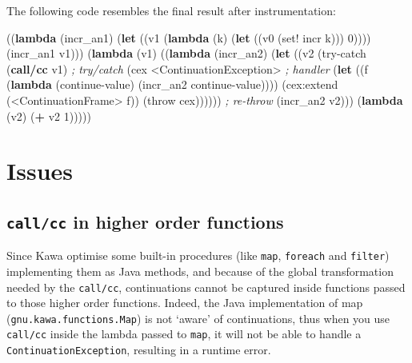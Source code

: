 \documentclass[12pt,a4paper,oneside,openright]{book}
\newenvironment{Shaded}{\begin{snugshade}}{\end{snugshade}}
\newcommand{\KeywordTok}[1]{\textcolor[rgb]{0.13,0.29,0.53}{\textbf{{#1}}}}
\newcommand{\DecValTok}[1]{\textcolor[rgb]{0.00,0.00,0.81}{{#1}}}
\newcommand{\CommentTok}[1]{\textcolor[rgb]{0.56,0.35,0.01}{\textit{{#1}}}}
\newcommand{\NormalTok}[1]{{#1}}
\begin{document}
The following code resembles the final result after instrumentation:

\begin{Shaded}
\begin{Highlighting}[]
    \NormalTok{((}\KeywordTok{lambda} \NormalTok{(incr_an1)}
      \NormalTok{(}\KeywordTok{let} \NormalTok{((v1 (}\KeywordTok{lambda} \NormalTok{(k)}
                  \NormalTok{(}\KeywordTok{let} \NormalTok{((v0 (set! incr k)))}
                    \DecValTok{0}\NormalTok{))))}
         \NormalTok{(incr_an1 v1)))}
     \NormalTok{(}\KeywordTok{lambda} \NormalTok{(v1)}
       \NormalTok{((}\KeywordTok{lambda} \NormalTok{(incr_an2)}
          \NormalTok{(}\KeywordTok{let} \NormalTok{((v2 (try-catch (}\KeywordTok{call/cc} \NormalTok{v1)             }\CommentTok{; try/catch}
                      \NormalTok{(cex <ContinuationException>      }\CommentTok{; handler}
                         \NormalTok{(}\KeywordTok{let} \NormalTok{((f (}\KeywordTok{lambda} \NormalTok{(continue-value)}
                                    \NormalTok{(incr_an2 continue-value))))}
                         \NormalTok{(cex:extend (<ContinuationFrame> f))}
                         \NormalTok{(throw cex))))))               }\CommentTok{; re-throw}
            \NormalTok{(incr_an2 v2)))}
        \NormalTok{(}\KeywordTok{lambda} \NormalTok{(v2)}
          \NormalTok{(}\KeywordTok{+} \NormalTok{v2 }\DecValTok{1}\NormalTok{)))))}
\end{Highlighting}
\end{Shaded}

\section{Issues}\label{issues}

\subsection{\texorpdfstring{\texttt{call/cc} in higher order
functions}{call/cc in higher order functions}}\label{callcc-in-higher-order-functions}

Since Kawa optimise some built-in procedures (like \texttt{map},
\texttt{foreach} and \texttt{filter}) implementing them as Java methods,
and because of the global transformation needed by the \texttt{call/cc},
continuations cannot be captured inside functions passed to those higher
order functions. Indeed, the Java implementation of map
(\texttt{gnu.kawa.functions.Map}) is not `aware' of continuations, thus
when you use \texttt{call/cc} inside the lambda passed to \texttt{map},
it will not be able to handle a \texttt{ContinuationException},
resulting in a runtime error.
\end{document}
